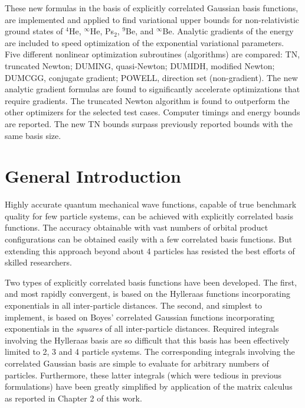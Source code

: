 \documentclass[12pt,thmsa,suthesis,verbatim]{report}
\begin{document}
These new formulas in the basis of explicitly correlated Gaussian basis
functions, are implemented and applied to find variational upper bounds for
non-relativistic ground states of $^4$He, $^\infty $He, Ps$_2$, $^9$Be, and $%
^\infty $Be. Analytic gradients of the energy are included to speed
optimization of the exponential variational parameters. Five different
nonlinear optimization subroutines (algorithms) are compared: TN, truncated
Newton; DUMING, quasi-Newton; DUMIDH, modified Newton; DUMCGG, conjugate
gradient; POWELL, direction set (non-gradient). The new analytic gradient
formulas are found to significantly accelerate optimizations that require
gradients. The truncated Newton algorithm is found to outperform the other
optimizers for the selected test cases. Computer timings and energy bounds
are reported. The new TN bounds surpass previously reported bounds with the
same basis size.

\afterpreface



\chapter{General Introduction}

Highly accurate quantum mechanical wave functions, capable of true benchmark
quality for few particle systems, can be achieved with explicitly correlated
basis functions. The accuracy obtainable with vast numbers of orbital
product configurations can be obtained easily with a few correlated basis
functions. But extending this approach beyond about 4 particles has resisted
the best efforts of skilled researchers.

Two types of explicitly correlated basis functions have been developed. The
first, and most rapidly convergent, is based on the Hylleraas functions
incorporating exponentials in all inter-particle distances. The second, and
simplest to implement, is based on Boyes' correlated Gaussian functions
incorporating exponentials in the \emph{squares} of all inter-particle
distances. Required integrals involving the Hylleraas basis are so difficult
that this basis has been effectively limited to 2, 3 and 4 particle systems.
The corresponding integrals involving the correlated Gaussian basis are
simple to evaluate for arbitrary numbers of particles. Furthermore, these
latter integrals (which were tedious in previous formulations) have been
greatly simplified by application of the matrix calculus as reported in
Chapter 2 of this work\cite{Kinghorn95a}.
\end{document}
